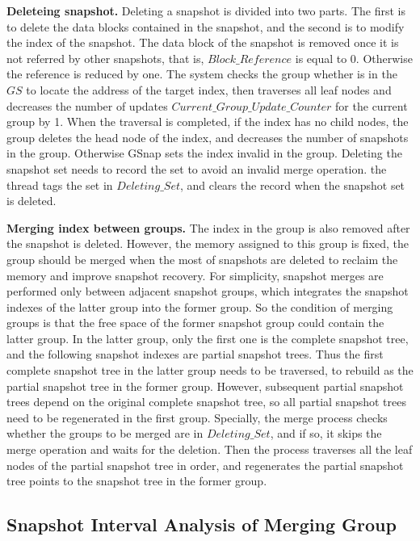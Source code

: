 \documentclass[sigconf, nonacm]{acmart}
\begin{document}
\textbf{Deleteing snapshot.} Deleting a snapshot is divided into two parts. The first is to delete the data blocks contained in the snapshot, and the second is to modify the index of the snapshot. 
The data block of the snapshot is removed once it is not referred by other snapshots, that is, $Block\_Reference$ is equal to 0. Otherwise the reference is reduced by one.
The system checks the group whether is in the $GS$ to locate the address of the target index, then traverses all leaf nodes and decreases the number of updates $Current\_Group\_Update\_Counter$ for the current group by 1. When the traversal is completed, if the index has no child nodes, the group deletes the head node of the index, and decreases the number of snapshots in the group. Otherwise GSnap sets the index invalid in the group. Deleting the snapshot set needs to record the set to avoid an invalid merge operation. the thread tags the set in $Deleting\_Set$, and clears the record when the snapshot set is deleted.

\textbf{Merging index between groups.} The index in the group is also removed after the snapshot is deleted. However, the memory assigned to this group is fixed, the group should be merged when the most of snapshots are deleted to reclaim the memory and improve snapshot recovery.
For simplicity, snapshot merges are performed only between adjacent snapshot groups, which integrates the snapshot indexes of the latter group into the former group. So the condition of merging groups is that the free space of the former snapshot group could contain the latter group. In the latter group, only the first one is the complete snapshot tree, and the following snapshot indexes are partial snapshot trees. Thus the first complete snapshot tree in the latter group needs to be traversed, to rebuild as the partial snapshot tree in the former group. However, subsequent partial snapshot trees depend on the original complete snapshot tree, so all partial snapshot trees need to be regenerated in the first group. Specially, the merge process checks whether the groups to be merged are in $Deleting\_Set$, and if so, it skips the merge operation and waits for the deletion. Then the process traverses all the leaf nodes of the partial snapshot tree in order, and regenerates the partial snapshot tree points to the snapshot tree in the former group. 

\subsection{Snapshot Interval Analysis of Merging Group}
\end{document}
